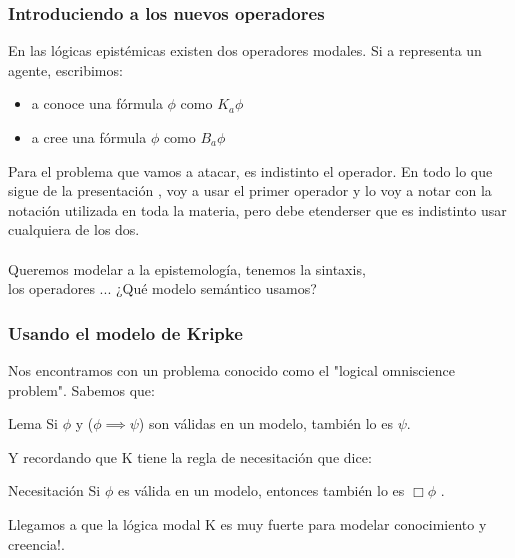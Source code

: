 \documentclass{beamer}
\begin{document}
\begin{frame}
\frametitle{Introduciendo a los nuevos operadores}
En las l\'ogicas epist\'emicas existen dos operadores modales. Si a representa un agente, escribimos:
\begin{itemize}
\item a conoce una f\'ormula $\phi$ como $K_{a}\phi$ 
\item a cree una f\'ormula $\phi$ como $B_{a}\phi$ 
\end{itemize}

Para el problema que vamos a atacar, es indistinto el operador. En todo lo que sigue de la presentaci\'on , voy a usar el primer operador y lo voy a notar con la notaci\'on utilizada en toda la materia, pero debe etenderser que es indistinto usar cualquiera de los dos. \\~\\

Queremos modelar a la epistemolog\'ia, tenemos la sintaxis,\\
los operadores ... ¿Qu\'e modelo sem\'antico usamos?
\end{frame}


\begin{frame}
\frametitle{Usando el modelo de Kripke}
Nos encontramos con un problema conocido como el "logical omniscience problem". Sabemos que: 
\begin{block}{Lema}
Si $\phi$ y ($\phi \implies \psi$) son v\'alidas en un modelo, tambi\'en lo es $\psi$.
\end{block}

Y recordando que K tiene la regla de necesitaci\'on que dice:
\begin{block}{Necesitaci\'on}
Si $\phi$ es v\'alida en un modelo, entonces tambi\'en lo es $\Box\phi$ .
\end{block}
Llegamos a que la l\'ogica modal K es muy fuerte para modelar conocimiento y creencia!.
\end{frame}

\end{document}
